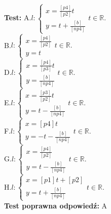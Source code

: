 \documentclass[12pt, a4paper]{article}
\theoremstyle{definition} %
\newcommand{\testStart}{\noindent \textbf{Test:}\newline} %
\newcommand{\testStop}{\newline} %
\newcommand{\kluczStart}{\noindent \textbf{Test poprawna odpowiedź:}\newline} %
\newcommand{\kluczStop}{\newline} %
\begin{document}
\testStart
A.$l:\left\{ \begin{array}{ll}
x=\frac{[p4]}{[p2]}t\\
y=t+\frac{[b]}{[np4]}
\end{array}\right.  t\in\mathbb{R}.$\\
B.$l:\left\{ \begin{array}{ll}
x=\frac{[p4]}{[p2]}\\
y=t
\end{array}\right.  t\in\mathbb{R}.$\\
D.$l:\left\{ \begin{array}{ll}
x=\frac{[p4]}{[p3]}t\\
y=\frac{[b]}{[np4]}
\end{array}\right.  t\in\mathbb{R}.$\\
E.$l:\left\{ \begin{array}{ll}
x=\frac{[p3]}{[p2]}t\\
y=t-\frac{[b]}{[np4]}
\end{array}\right.  t\in\mathbb{R}.$\\
F.$l:\left\{ \begin{array}{ll}
x=[p4]t\\
y=-t-\frac{[b]}{[np4]}
\end{array}\right.  t\in\mathbb{R}.$\\
G.$l:\left\{ \begin{array}{ll}
x=\frac{[p4]}{[p2]}\\
y=t-\frac{[b]}{[np4]}
\end{array}\right.  t\in\mathbb{R}.$\\
H.$l:\left\{ \begin{array}{ll}
x=[p1]t+[p2]\\
y=t+\frac{[b]}{[np4]}
\end{array}\right.  t\in\mathbb{R}.$\\
\testStop
\kluczStart
A
\kluczStop
\end{document}

